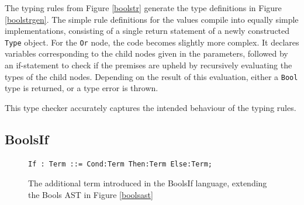 \documentclass[nofilelist]{cslthse-msc}
\newcommand{\CR}[1]{\textcolor{green!60!black}{[\textbf{CR}:#1]}}
\begin{document}
The typing rules from Figure \ref{boolstr} generate the type definitions in Figure \ref{boolstrgen}.
The simple rule definitions for the values compile into equally simple implementations, consisting of a single return statement of a newly constructed \lstinline{Type} object.
For the \lstinline{Or} node, the code becomes slightly more complex.
It declares variables corresponding to the child nodes given in the parameters, followed by an if-statement to check if the premises are upheld by recursively evaluating the types of the child nodes.
Depending on the result of this evaluation, either a \lstinline{Bool} type is returned, or a type error is thrown.

This type checker accurately captures the intended behaviour of the typing rules.

\subsection{BoolsIf}


\begin{figure}[]
\begin{lstlisting}[]
If : Term ::= Cond:Term Then:Term Else:Term;
\end{lstlisting}
  \caption{The additional term introduced in the BoolsIf language, extending the Bools AST in Figure \ref{boolsast}}
  \label{ifast}
\end{figure}
\end{document}
